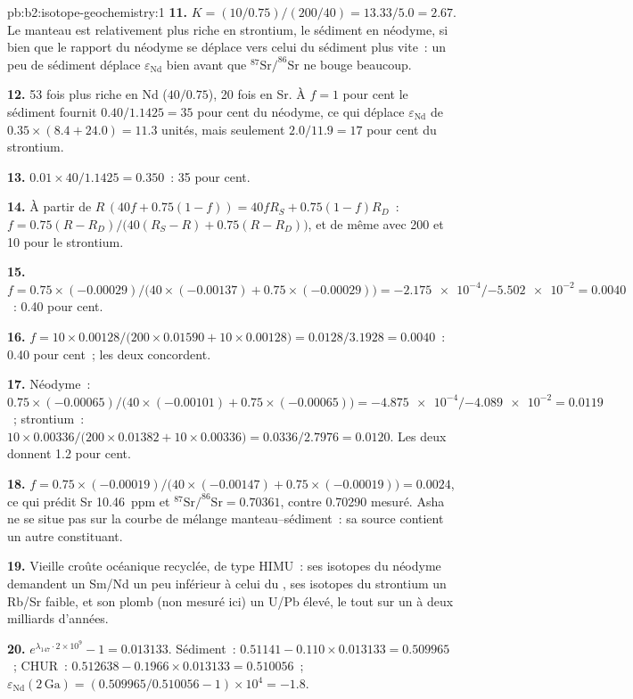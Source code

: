 \begin{solution}{pb:b2:isotope-geochemistry:1}
\textbf{11.} $K = (10/0.75)/(200/40) = 13.33/5.0 = 2.67$. Le manteau est relativement
plus riche en strontium, le sédiment en néodyme, si bien que le rapport du néodyme se déplace
vers celui du sédiment plus vite~: un peu de sédiment déplace $\varepsilon_{\mathrm{Nd}}$ bien avant que
$^{87}\mathrm{Sr}/^{86}\mathrm{Sr}$ ne bouge beaucoup.

\textbf{12.} 53 fois plus riche en Nd ($40/0.75$), 20 fois en Sr. À $f = 1$ pour cent le
sédiment fournit $0.40/1.1425 = 35$ pour cent du néodyme, ce qui déplace
$\varepsilon_{\mathrm{Nd}}$ de $0.35\times(8.4 + 24.0) = 11.3$ unités, mais seulement $2.0/11.9 =
17$ pour cent du strontium.

\textbf{13.} $0.01\times40/1.1425 = 0.350$~: 35 pour cent.

\textbf{14.} À partir de $R\,(40f + 0.75(1-f)) = 40fR_S + 0.75(1-f)R_D$~:
$f = 0.75(R - R_D)/\bigl(40(R_S - R) + 0.75(R - R_D)\bigr)$, et de même avec 200
et 10 pour le strontium.

\textbf{15.} $f = 0.75\times(-0.00029)/\bigl(40\times(-0.00137) + 0.75\times(-0.00029)\bigr)
= \num{-2.175e-4}/\num{-5.502e-2} = 0.0040$~: 0.40 pour cent.

\textbf{16.} $f = 10\times0.00128/\bigl(200\times0.01590 + 10\times0.00128\bigr) =
0.0128/3.1928 = 0.0040$~: 0.40 pour cent~; les deux concordent.

\textbf{17.} Néodyme~: $0.75\times(-0.00065)/\bigl(40\times(-0.00101) +
0.75\times(-0.00065)\bigr) = \num{-4.875e-4}/\num{-4.089e-2} = 0.0119$~; strontium~:
$10\times0.00336/\bigl(200\times0.01382 + 10\times0.00336\bigr) = 0.0336/2.7976 = 0.0120$.
Les deux donnent 1.2 pour cent.

\textbf{18.} $f = 0.75\times(-0.00019)/\bigl(40\times(-0.00147) + 0.75\times(-0.00019)\bigr)
= 0.0024$, ce qui prédit Sr \qty{10.46}{ppm} et $^{87}\mathrm{Sr}/^{86}\mathrm{Sr} =
0.70361$, contre 0.70290 mesuré. Asha ne se situe pas sur la courbe de mélange manteau--sédiment~:
sa source contient un autre constituant.

\textbf{19.} Vieille croûte océanique recyclée, de type HIMU~: ses isotopes du néodyme demandent un Sm/Nd
un peu inférieur à celui du , ses isotopes du strontium un Rb/Sr faible, et son
plomb (non mesuré ici) un U/Pb élevé, le tout sur un à deux milliards d'années.

\textbf{20.} $e^{\lambda_{147}\cdot2\times10^9} - 1 = 0.013133$. Sédiment~: $0.51141 -
0.110\times0.013133 = 0.509965$~; CHUR~: $0.512638 - 0.1966\times0.013133 = 0.510056$~;
$\varepsilon_{\mathrm{Nd}}(2\,\mathrm{Ga}) = (0.509965/0.510056 - 1)\times10^4 = -1.8$.


\end{solution}
